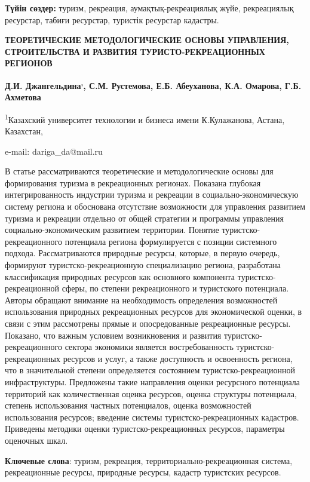 {\bfseries Түйін сөздер:} туризм, рекреация, аумақтық-рекреациялық жүйе,
рекреациялық ресурстар, табиғи ресурстар, туристік ресурстар кадастры.

\begin{center}
{\large\bfseries ТЕОРЕТИЧЕСКИЕ МЕТОДОЛОГИЧЕСКИЕ ОСНОВЫ УПРАВЛЕНИЯ, СТРОИТЕЛЬСТВА
И РАЗВИТИЯ ТУРИСТО-РЕКРЕАЦИОННЫХ РЕГИОНОВ}

{\bfseries Д.И. Джангельдина\textsuperscript{,}, С.М. Рустемова, Е.Б. Абеуханова, К.А. Омарова, Г.Б. Ахметова}

\textsuperscript{1}Казахский университет технологии и бизнеса имени
К.Кулажанова, Астана, Казахстан,

e-mail: dariga\_da@mail.ru
\end{center}

В статье рассматриваются теоретические и методологические основы для
формирования туризма в рекреационных регионах. Показана глубокая
интегрированность индустрии туризма и рекреации в
социально-экономическую систему региона и обоснована отсутствие
возможности для управления развитием туризма и рекреации отдельно от
общей стратегии и программы управления социально-экономическим развитием
территории. Понятие туристско-рекреационного потенциала региона
формулируется с позиции системного подхода. Рассматриваются природные
ресурсы, которые, в первую очередь, формируют туристско-рекреационную
специализацию региона, разработана классификация природных ресурсов как
основного компонента туристско-рекреационной сферы, по степени
рекреационного и туристского потенциала. Авторы обращают внимание на
необходимость определения возможностей использования природных
рекреационных ресурсов для экономической оценки, в связи с этим
рассмотрены прямые и опосредованные рекреационные ресурсы. Показано, что
важным условием возникновения и развития туристско-рекреационного
сектора экономики является востребованность туристско-рекреационных
ресурсов и услуг, а также доступность и освоенность региона, что в
значительной степени определяется состоянием туристско-рекреационной
инфраструктуры. Предложены такие направления оценки ресурсного
потенциала территорий как количественная оценка ресурсов, оценка
структуры потенциала, степень использования частных потенциалов, оценка
возможностей использования ресурсов; введение системы
туристско-рекреационных кадастров. Приведены методики оценки
туристско-рекреационных ресурсов, параметры оценочных шкал.

{\bfseries Ключевые слова}: туризм, рекреация, территориально-рекреационная
система, рекреационные ресурсы, природные ресурсы, кадастр туристских
ресурсов.

